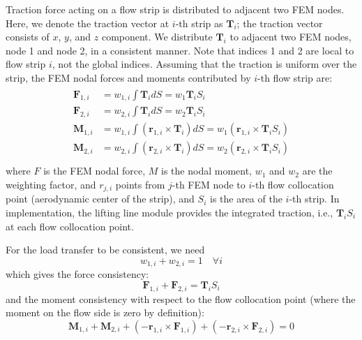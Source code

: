 \documentclass[10pt]{article}
\newcommand{\mb}[1]{\boldsymbol{\mathbf{#1}}} %
\begin{document}
Traction force acting on a flow strip is distributed to adjacent two FEM nodes.
Here, we denote the traction vector at $i$-th strip as $\mb{T}_i$; the traction vector consists of $x$, $y$, and $z$ component.
We distribute $\mb{T}_i$ to adjacent two FEM nodes, node 1 and node 2, in a consistent manner.
Note that indices 1 and 2 are local to flow strip $i$, not the global indices.
Assuming that the traction is uniform over the strip, the FEM nodal forces and moments contributed by $i$-th flow strip are:
\begin{align}
\begin{aligned}
	\mb{F}_{1,i} &= w_{1,i} \int \mb{T}_i dS = w_1 \mb{T}_i S_i\\
	\mb{F}_{2,i} &= w_{2,i} \int\mb{T}_i dS = w_2 \mb{T}_i S_i\\
	\mb{M}_{1,i} &= w_{1,i} \int \left( \mb{r}_{1, i} \times \mb{T}_i \right) dS = w_1 \left( \mb{r}_{1, i} \times \mb{T}_i S_i \right)  \\
	\mb{M}_{2,i} &= w_{2,i} \int \left( \mb{r}_{2, i} \times \mb{T}_i \right) dS = w_2 \left( \mb{r}_{2, i} \times \mb{T}_i S_i \right)  \\
\end{aligned}
\end{align}
where $F$ is the FEM nodal force, $M$ is the nodal moment, $w_1$ and $w_2$ are the weighting factor, and $r_{j, i}$ points from $j$-th FEM node to $i$-th flow collocation point (aerodynamic center of the strip), and $S_i$ is the area of the $i$-th strip.
In implementation, the lifting line module provides the integrated traction, i.e., $\mb{T}_i S_i$ at each flow collocation point.

For the load transfer to be consistent, we need
\begin{equation}
	w_{1,i} + w_{2,i} = 1 \quad \forall i
\end{equation}
which gives the force consistency:
\begin{equation}
	\mb{F}_{1,i} + \mb{F}_{2,i} = \mb{T}_i S_i
\end{equation}
and the moment consistency with respect to the flow collocation point (where the moment on the flow side is zero by definition):   %
\begin{equation}
	\mb{M}_{1,i} + \mb{M}_{2,i} + (-\mb{r}_{1, i} \times \mb{F}_{1,i}) + (-\mb{r}_{2, i} \times \mb{F}_{2,i}) = 0
\end{equation}
\end{document}

